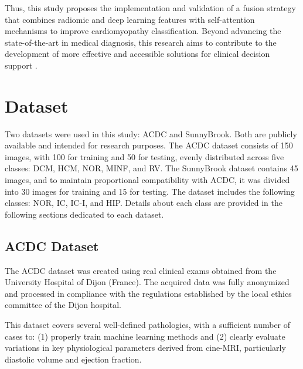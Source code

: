 \documentclass[journal,twoside,web]{ieeecolor}
\begin{document}
Thus, this study proposes the implementation and validation of a fusion strategy that combines radiomic and deep learning features with self-attention mechanisms to improve cardiomyopathy classification. Beyond advancing the state-of-the-art in medical diagnosis, this research aims to contribute to the development of more effective and accessible solutions for clinical decision support \cite{brielerCardiomyopathyOverview2017}.



\section{Dataset}
Two datasets were used in this study: ACDC and SunnyBrook. Both are publicly available and intended for research purposes. The ACDC dataset consists of 150 images, with 100 for training and 50 for testing, evenly distributed across five classes: DCM, HCM, NOR, MINF, and RV. The SunnyBrook dataset contains 45 images, and to maintain proportional compatibility with ACDC, it was divided into 30 images for training and 15 for testing. The dataset includes the following classes: NOR, IC, IC-I, and HIP. Details about each class are provided in the following sections dedicated to each dataset.

\subsection{ACDC Dataset}
The ACDC dataset was created using real clinical exams obtained from the University Hospital of Dijon (France). The acquired data was fully anonymized and processed in compliance with the regulations established by the local ethics committee of the Dijon hospital.  

This dataset covers several well-defined pathologies, with a sufficient number of cases to: (1) properly train machine learning methods and  
(2) clearly evaluate variations in key physiological parameters derived from cine-MRI, particularly diastolic volume and ejection fraction.  
\end{document}
